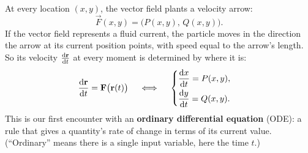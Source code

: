 At every location $(x,y)$, the vector field plants a velocity arrow:
\[
  \vec F(x,y) = \big(P(x,y),\, Q(x,y)\big).
\]
If the vector field represents a fluid current, the particle moves in the direction
the arrow at its current position points, with speed equal to the arrow's length.
So its velocity $\frac{\mathrm{d} \mathbf{r}}{\mathrm{d} t}$ at every moment is determined by where it is:
\begin{equation}
  \frac{\mathrm{d} \mathbf{r}}{\mathrm{d} t} = \mathbf{F}\big(\mathbf{r}(t)\big)
  \quad\iff\quad
  \begin{cases}
    \displaystyle \frac{\mathrm{d} x}{\mathrm{d} t} = P(x, y),\\[6pt]
    \displaystyle \frac{\mathrm{d} y}{\mathrm{d} t} = Q(x, y).
  \end{cases}
  \label{ch35:eq-field-ode}
\end{equation}
This is our first encounter with an \textbf{ordinary differential equation} (ODE):
a rule that gives a quantity's rate of change in terms of its current value.
(``Ordinary'' means there is a single input variable, here the time $t$.)

